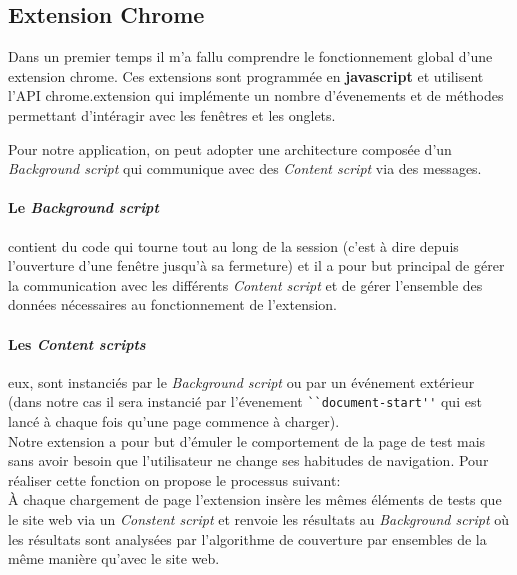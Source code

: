 \documentclass[oneside,a4paper,12pt]{article}
\begin{document}
\subsection{Extension Chrome}\label{Projet:extension}

Dans un premier temps il m'a fallu comprendre le fonctionnement global d'une extension chrome. Ces extensions sont programmée en \textbf{javascript} et utilisent l'API chrome.extension qui implémente un nombre d'évenements et de méthodes permettant d'intéragir avec les fenêtres et les onglets. 

Pour notre application, on peut adopter une architecture composée d'un \textit{Background script} qui communique avec des \textit{Content script} via des messages. 
\paragraph*{Le \textit{Background script}} contient du code qui tourne tout au long de la session (c'est à dire depuis l'ouverture d'une fenêtre jusqu'à sa fermeture) et il a pour but principal de gérer la communication avec les différents \textit{Content script} et de gérer l'ensemble des données nécessaires au fonctionnement de l'extension.
\paragraph*{Les \textit{Content scripts}} eux, sont instanciés par le \textit{Background script} ou par un événement extérieur (dans notre cas il sera instancié par l'évenement \lstinline{``document-start''} qui est lancé à chaque fois qu'une page commence à charger).\\

Notre extension a pour but d'émuler le comportement de la page de test mais sans avoir besoin que l'utilisateur ne change ses habitudes de navigation. Pour réaliser cette fonction on propose le processus suivant:\\

\`A chaque chargement de page l'extension insère les mêmes éléments de tests que le site web via un \textit{Constent script} et renvoie les résultats au \textit{Background script} où les résultats sont analysées par l'algorithme de couverture par ensembles de la même manière qu'avec le site web.\\
\end{document}
